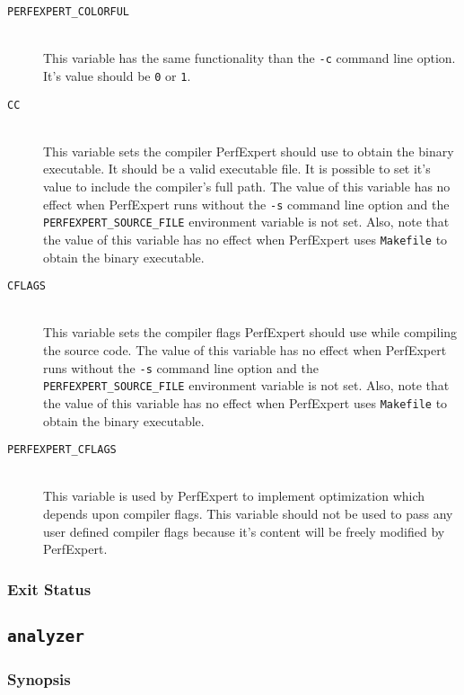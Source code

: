 \begin{description}
	\item[\texttt{PERFEXPERT\_COLORFUL}]\hfill \\
	This variable has the same functionality than the \texttt{-c} command line option. It's value should be \texttt{0} or \texttt{1}.
	
	\item[\texttt{CC}]\hfill \\
	This variable sets the compiler PerfExpert should use to obtain the binary executable. It should be a valid executable file. It is possible to set it's value to include the compiler's full path. The value of this variable has no effect when PerfExpert runs without the \texttt{-s} command line option and the \texttt{PERFEXPERT\_SOURCE\_FILE} environment variable is not set. Also, note that the value of this variable has no effect when PerfExpert uses \texttt{Makefile} to obtain the binary executable.

	\item[\texttt{CFLAGS}]\hfill \\
	This variable sets the compiler flags PerfExpert should use while compiling the source code. The value of this variable has no effect when PerfExpert runs without the \texttt{-s} command line option and the \texttt{PERFEXPERT\_SOURCE\_FILE} environment variable is not set. Also, note that the value of this variable has no effect when PerfExpert uses \texttt{Makefile} to obtain the binary executable.

	\item[\texttt{PERFEXPERT\_CFLAGS}]\hfill \\
	This variable is used by PerfExpert to implement optimization which depends upon compiler flags. This variable should not be used to pass any user defined compiler flags because it's content will be freely modified by PerfExpert.
\end{description}

\subsubsection{Exit Status}

\subsection{\texttt{analyzer}}

\subsubsection{Synopsis}

